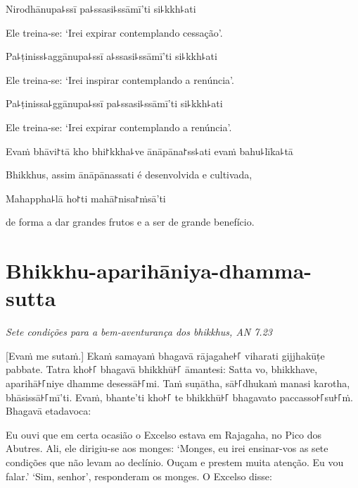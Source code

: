 Nirodhānupa꜕ssī pa꜕ssasi꜕ssāmī'ti si꜕kkh꜕ati

\begin{english}
  Ele treina-se: `Irei expirar contemplando cessação'.
\end{english}

Pa꜕ṭiniss꜕aggānupa꜕ssī a꜕ssasi꜕ssāmī'ti si꜕kkh꜕ati

\begin{english}
  Ele treina-se: `Irei inspirar contemplando a renúncia'.
\end{english}

Pa꜕ṭinissa꜕ggānupa꜕ssī pa꜕ssasi꜕ssāmī'ti si꜕kkh꜕ati

\begin{english}
  Ele treina-se: `Irei expirar contemplando a renúncia'.
\end{english}

Evaṁ bhāvi꜓tā kho bhi꜓kkha꜕ve ānāpāna꜓ss꜕ati evaṁ bahu꜕līka꜕tā

\begin{english}
  Bhikkhus, assim ānāpānassati é desenvolvida e cultivada,
\end{english}

Mahappha꜕lā ho꜓ti mahā꜓nisa꜓ṁsā'ti

\begin{english}
  de forma a dar grandes frutos e a ser de grande benefício.
\end{english}


\chapter[Aparihāniya-dhamma-sutta]{Bhikkhu-aparihāniya-dhamma-sutta}

\emph{Sete condições para a bem-aventurança dos bhikkhus, AN 7.23}

\begin{leader}
\end{leader}

[Evaṁ me sutaṁ.] Ekaṁ samayaṁ bhagavā rājagahe꜔꜒ viharati gijjhakūṭe pabbate.
Tatra kho꜔꜒ bhagavā bhikkhū꜔꜒ āmantesi: Satta vo, bhikkhave, aparihā꜔꜒niye dhamme
desessā꜔꜒mi. Taṁ suṇātha, sā꜔꜒dhukaṁ manasi karotha, bhāsissā꜔꜒mī'ti. Evaṁ, bhante'ti
kho꜔꜒ te bhikkhū꜔꜒ bhagavato paccasso꜔꜒su꜔꜒ṁ. Bhagavā etadavoca:

\begin{english}
  Eu ouvi que em certa ocasião o Excelso estava em Rajagaha, no Pico dos
  Abutres. Ali, ele dirigiu-se aos monges: `Monges, eu irei ensinar-vos as sete
  condições que não levam ao declínio. Ouçam e prestem muita atenção. Eu vou
  falar.' `Sim, senhor', responderam os monges. O Excelso disse:
\end{english}

